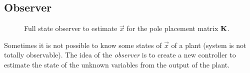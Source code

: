 
\subsection{Observer}

\begin{figure}
	\centering
	\resizebox{\linewidth}{!}{%
	}
	\caption{
		Full state observer to estimate \(\vec{x}\) for the pole placement matrix \(\bm{\mathrm{K}}\).
		\label{fig:ss-observer}
	}
\end{figure}

Sometimes it is not possible to know some states of \(\vec{x}\) of a plant (system is not totally observable). The idea of the \emph{observer} is to create a new controller to estimate the state of the unknown variables from the output of the plant. 
